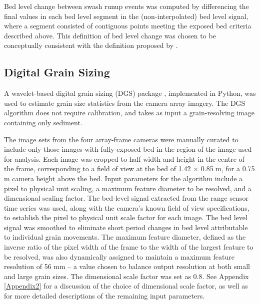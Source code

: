 Bed level change between swash runup events was computed by differencing the final values in each bed level segment in the (non-interpolated) bed level signal, where a segment consisted of contiguous points meeting the exposed bed criteria described above. This definition of bed level change was chosen to be conceptually consistent with the definition proposed by \citet{Blenkinsopp_etal2011}. %


\subsection{Digital Grain Sizing}

A wavelet-based digital grain sizing (DGS) package \citep[see][]{Buscombe2013}, implemented in Python, was used to estimate grain size statistics from the camera array imagery. The DGS algorithm does not require calibration, and takes as input a grain-resolving image containing only sediment. 

The image sets from the four array-frame cameras were manually curated to include only those images with fully exposed bed in the region of the image used for analysis. Each image was cropped to half width and height in the centre of the frame, corresponding to a field of view at the bed of 1.42 $\times$ 0.85 m, for a 0.75 m camera height above the bed. Input parameters for the algorithm include a pixel to physical unit scaling, a maximum feature diameter to be resolved, and a dimensional scaling factor. The bed-level signal extracted from the range sensor time series was used, along with the camera's known field of view specifications, to establish the pixel to physical unit scale factor for each image. The bed level signal was smoothed to eliminate short period changes in bed level attributable to individual grain movements. The maximum feature diameter, defined as the inverse ratio of the pixel width of the frame to the width of the largest feature to be resolved, was also dynamically assigned to maintain a maximum feature resolution of 56 mm -- a value chosen to balance output resolution at both small and large grain sizes. The dimensional scale factor was set as 0.8. See Appendix \ref{Appendix2} for a discussion of the choice of dimensional scale factor, as well as for more detailed descriptions of the remaining input parameters. 

